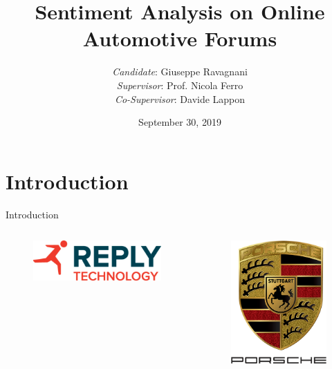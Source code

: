 \documentclass{beamer}
\title{Sentiment Analysis on Online Automotive Forums}
\author[me]{\vspace{5mm}\textit{Candidate}: Giuseppe Ravagnani\\\textit{Supervisor}: Prof. Nicola Ferro\\\textit{Co-Supervisor}: Davide Lappon\\[5mm]}
\date{September 30, 2019}
\begin{document}
	\maketitle



	\section{Introduction}
	
	\begin{frame}{Introduction}
		\begin{columns}
			\centering
			\begin{figure}
				\includegraphics[width=.9\linewidth]{figures/reply2.pdf}
			\end{figure}
			\centering
			\begin{figure}
				\includegraphics[width=.6\linewidth]{figures/porsche2.png}
			\end{figure}
		\end{columns}
	\end{frame}
	
\end{document}

